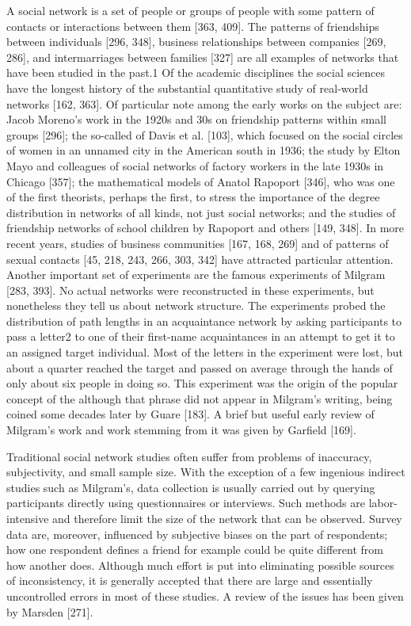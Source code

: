       A social network is a set of people or groups of people with some pattern of contacts or interactions between them [363, 409]. The patterns of friendships between individuals [296, 348], business relationships between companies [269, 286], and intermarriages between families [327] are all examples of networks that have been studied in the past.1 Of the academic disciplines the social sciences have the longest history of the substantial quantitative study of real-world networks [162, 363]. Of particular note among the early works on the subject are: Jacob Moreno's work in the 1920s and 30s on friendship patterns within small groups [296]; the so-called  of Davis et al. [103], which focused on the social circles of women in an unnamed city in the American south in 1936; the study by Elton Mayo and colleagues of social networks of factory workers in the late 1930s in Chicago [357]; the mathematical models of Anatol Rapoport [346], who was one of the first theorists, perhaps the first, to stress the importance of the degree distribution in networks of all kinds, not just social networks; and the studies of friendship networks of school children by Rapoport and others [149, 348]. In more recent years, studies of business communities [167, 168, 269] and of patterns of sexual contacts [45, 218, 243, 266, 303, 342] have attracted particular attention.
Another important set of experiments are the famous  experiments of Milgram [283, 393]. No actual networks were reconstructed in these experiments, but nonetheless they tell us about network structure. The experiments probed the distribution of path lengths in an acquaintance network by asking participants to pass a letter2 to one of their first-name acquaintances in an attempt to get it to an assigned target individual. Most of the letters in the experiment were lost, but about a quarter reached the target and passed on average through the hands of only about six people in doing so. This experiment was the origin of the popular concept of the  although that phrase did not appear in Milgram's writing, being coined some decades later by Guare [183]. A brief but useful early review of Milgram’s work and work stemming from it was given by Garfield [169].
      
      Traditional social network studies often suffer from problems of inaccuracy, subjectivity, and small sample size. With the exception of a few ingenious indirect studies such as Milgram’s, data collection is usually carried out by querying participants directly using questionnaires or interviews. Such methods are labor-intensive and therefore limit the size of the network that can be observed. Survey data are, moreover, influenced by subjective biases on the part of respondents; how one respondent defines a friend for example could be quite different from how another does. Although much effort is put into eliminating possible sources of inconsistency, it is generally accepted that there are large and essentially uncontrolled errors in most of these studies. A review of the issues has been given by Marsden [271].
      

